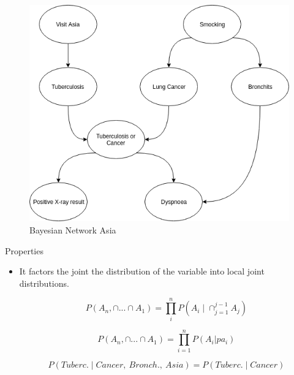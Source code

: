 \begin{frame}
    \begin{figure}[!h]
        \centering
        \includegraphics[scale=0.3]{figuras/asia.png}
        \caption{Bayesian Network Asia}
        \label{fig:asia}
    \end{figure}

\end{frame}

\begin{frame}
    Properties
    \begin{itemize}
        \item {It factors the joint the distribution of the variable into local joint distributions.
        
        \begin{equation}
            P(A_n,\cap ... \cap A_1) = \prod_i^n P(A_i \mid \cap_{j=1}^{j-1}A_j)           
            \label{eq:bayes}
        \end{equation}

        \begin{equation}
            P(A_n,\cap ...\cap A_1) = \prod_{i=1}^n P(A_i|pa_i)
            \label{eq:compact_joint}
        \end{equation}

        \begin{equation}
            P(Tuberc.\mid Cancer,\ Bronch.,\ Asia) = P(Tuberc.\mid Cancer)
            \label{eq:ind_cond}
        \end{equation}    
        }
    \end{itemize}
\end{frame}

